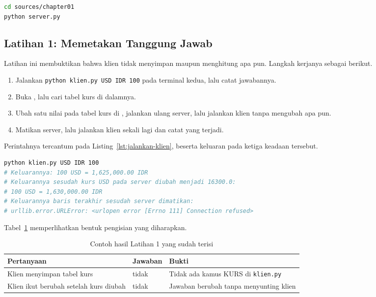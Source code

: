 \begin{lstlisting}[language=bash, caption={Menjalankan server pada terminal pertama},
  label=lst:jalankan-server]
cd sources/chapter01
python server.py
\end{lstlisting}

\subsection*{Latihan 1: Memetakan Tanggung Jawab}

Latihan ini membuktikan bahwa klien tidak menyimpan maupun menghitung apa pun.
Langkah kerjanya sebagai berikut.

\begin{enumerate}
  \item Jalankan \texttt{python klien.py USD IDR 100} pada terminal kedua, lalu
    catat jawabannya.
  \item Buka , lalu cari tabel kurs di
    dalamnya.
  \item Ubah satu nilai pada tabel kurs di ,
    jalankan ulang server, lalu jalankan klien tanpa mengubah apa pun.
  \item Matikan server, lalu jalankan klien sekali lagi dan catat yang terjadi.
\end{enumerate}

Perintahnya tercantum pada Listing~\ref{lst:jalankan-klien}, beserta keluaran
pada ketiga keadaan tersebut.

\begin{lstlisting}[language=bash, caption={Menjalankan klien pada terminal
  kedua, skrip tersedia di \berkas{sources/chapter01/klien.py}},
  label=lst:jalankan-klien]
python klien.py USD IDR 100
# Keluarannya: 100 USD = 1,625,000.00 IDR
# Keluarannya sesudah kurs USD pada server diubah menjadi 16300.0:
# 100 USD = 1,630,000.00 IDR
# Keluarannya baris terakhir sesudah server dimatikan:
# urllib.error.URLError: <urlopen error [Errno 111] Connection refused>
\end{lstlisting}

Tabel~\ref{tab:lat1cs-contoh} memperlihatkan bentuk pengisian yang diharapkan.

\begin{table}[htbp]
  \centering
  \caption{Contoh hasil Latihan 1 yang sudah terisi}
  \label{tab:lat1cs-contoh}
  \begin{tabularx}{\textwidth}{|X|l|X|}
    \hline
    \textbf{Pertanyaan} & \textbf{Jawaban} & \textbf{Bukti} \\
    \hline
    Klien menyimpan tabel kurs & tidak & Tidak ada kamus KURS di \texttt{klien.py} \\
    \hline
    Klien ikut berubah setelah kurs diubah & tidak & Jawaban berubah tanpa menyunting klien \\
    \hline
  \end{tabularx}
\end{table}

